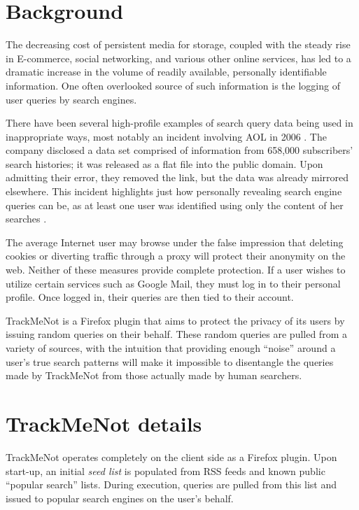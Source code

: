 \documentclass[11pt]{article}
\begin{document}
\begin{multicols}{2}
\section{Background}
\label{sec:background}

The decreasing cost of persistent media for storage, coupled with the
steady rise in E-commerce, social networking, and various other online
services, has led to a dramatic increase in the volume of readily
available, personally identifiable information. One often overlooked
source of such information is the logging of user queries by search
engines.

There have been several high-profile examples of search query data
being used in inappropriate ways, most notably an incident involving
AOL in 2006 \cite{aol}. The company disclosed a data set comprised of
information from 658,000 subscribers' search histories; it was
released as a flat file into the public domain. Upon admitting their
error, they removed the link, but the data was already mirrored
elsewhere. This incident highlights just how personally revealing
search engine queries can be, as at least one user was identified
using only the content of her searches \cite{user4417749}.

The average Internet user may browse under the false impression that
deleting cookies or diverting traffic through a proxy will protect
their anonymity on the web. Neither of these measures provide complete
protection. If a user wishes to utilize certain services such as
Google Mail, they must log in to their personal profile. Once logged
in, their queries are then tied to their account.

TrackMeNot is a Firefox plugin that aims to protect the privacy of its users by issuing random queries on their behalf. These random queries are pulled from a variety of sources, with the intuition that providing enough ``noise'' around a user's true search patterns will make it impossible to disentangle the queries made by TrackMeNot from those actually made by human searchers.

\section{TrackMeNot details}
\label{sec:tmn}
TrackMeNot operates completely on the client side as a Firefox plugin. Upon start-up, an initial {\it seed list} is populated from RSS feeds and known public ``popular search'' lists. During execution, queries are pulled from this list and issued to popular search engines on the user's behalf.


\end{multicols}
\end{document}
